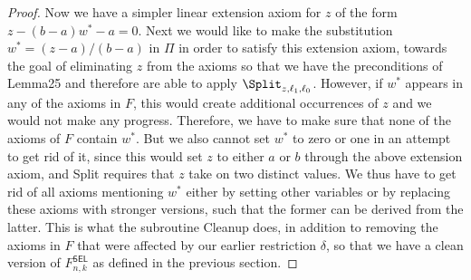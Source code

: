 \begin{proof}
Now we have a simpler linear extension axiom for $z$ of the form $z-(b-a)w^*-a=0$. Next we would like to make the substitution $w^*=(z-a)/(b-a)$ in $\Pi$ in order to satisfy this extension axiom, towards the goal of eliminating $z$ from the axioms so that we have the preconditions of Lemma25 and therefore are able to apply $\Split_{z,\ell_1,\ell_0}$. However, if $w^*$ appears in any of the axioms in $F$, this would create additional occurrences of $z$ and we would not make any progress. Therefore, we have to make sure that none of the axioms of $F$ contain $w^*$. But we also cannot set $w^*$ to zero or one in an attempt to get rid of it, since this would set $z$ to either $a$ or $b$ through the above extension axiom, and Split requires that $z$ take on two distinct values. We thus have to get rid of all axioms mentioning $w^*$ either by setting other variables or by replacing these axioms with stronger versions, such that the former can be derived from the latter. This is what the subroutine Cleanup does, in addition to removing the axioms in $F$ that were affected by our earlier restriction $\delta$, so that we have a clean version of $F^{\mathsf{SEL}}_{n,k}$ as defined in the previous section.

\end{proof}
